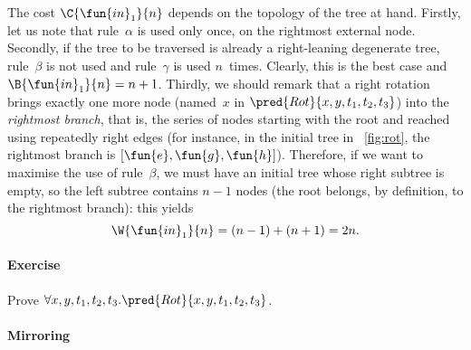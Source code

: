 The cost \(\C{\fun{in}_1}{n}\) depends
on the topology of the tree at hand. Firstly, let us note that
rule~\(\alpha\) is used only once, on the rightmost external
node. Secondly, if the tree to be traversed is already a
right\hyp{}leaning degenerate 
tree, rule~\(\beta\) is not used and rule~\(\gamma\) is used
\(n\)~times. Clearly, this is the best case and \(\B{\fun{in}_1}{n} =
n + 1\). Thirdly, we should remark that
a right rotation brings exactly one more node (named~\(x\) in
\(\pred{Rot}{x,y,t_1,t_2,t_3}\)) into the
\emph{rightmost branch}, that is, the series of
nodes starting with the root and reached using repeatedly right edges
(for instance, in the initial tree in \fig~\vref{fig:rot}, the
rightmost branch is \([\fun{e}, \fun{g},
\fun{h}]\)). Therefore, if we want to maximise the use of
rule~\(\beta\), we must have an initial tree whose right subtree is
empty, so the left subtree contains \(n-1\) nodes (the root belongs,
by definition, to the rightmost branch): this yields
\begin{equation*}
  \W{\fun{in}_1}{n} = (n-1) + (n+1) = 2n.
  \index{in1@$\W{\fun{in}_1}{n}$}
  \index{binary tree!rotation|)}
\end{equation*}

\paragraph{Exercise}

Prove \(\forall x,y,t_1,t_2,t_3.\pred{Rot}{x,y,t_1,t_2,t_3}\).

\paragraph{Mirroring}

